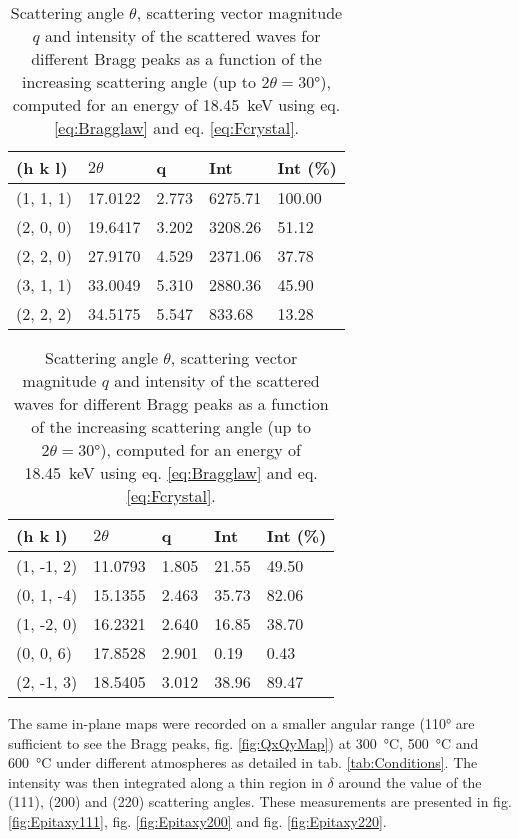 \begin{table}[htb!]
    \begin{minipage}{.45\linewidth}
        \centering
        \begin{tabular}{@{}lllll@{}}
        \toprule
        (h k l) & $2\theta$ & q & Int & Int (\%) \\
        \midrule
        (1, 1, 1) & 17.0122 & 2.773 & 6275.71 & 100.00 \\
        (2, 0, 0) & 19.6417 & 3.202 & 3208.26 & 51.12 \\
        (2, 2, 0) & 27.9170 & 4.529 & 2371.06 & 37.78 \\
        (3, 1, 1) & 33.0049 & 5.310 & 2880.36 & 45.90 \\
        (2, 2, 2) & 34.5175 & 5.547 & 833.68 & 13.28 \\
        \bottomrule
        \end{tabular}%
    \end{minipage}%
    \hfill
    \begin{minipage}{.45\linewidth}
        \centering
        \begin{tabular}{@{}lllll@{}}
        \toprule
        (h k l) & $2\theta$ & q & Int & Int (\%) \\
        \midrule
        (1, -1, 2) & 11.0793 & 1.805 & 21.55 & 49.50 \\
        (0, 1, -4) & 15.1355 & 2.463 & 35.73 & 82.06 \\
        (1, -2, 0) & 16.2321 & 2.640 & 16.85 & 38.70 \\
        (0, 0, 6)  & 17.8528 & 2.901 & 0.19  & 0.43  \\
        (2, -1, 3) & 18.5405 & 3.012 & 38.96 & 89.47 \\
        \bottomrule
        \end{tabular}%
    \end{minipage}%
    \label{tab:Reflections}
    \caption{
        Scattering angle $\theta$, scattering vector magnitude $q$ and intensity of the scattered waves for different Bragg peaks as a function of the increasing scattering angle (up to $2\theta = \ang{30}$), computed for an energy of \qty{18.45}{\keV} using eq. \ref{eq:Bragglaw} and eq. \ref{eq:Fcrystal}.
    }
\end{table}

The same in-plane maps were recorded on a smaller angular range (\ang{110} are sufficient to see the Bragg peaks, fig. \ref{fig:QxQyMap}) at \qty{300}{\degreeCelsius}, \qty{500}{\degreeCelsius} and \qty{600}{\degreeCelsius} under different atmospheres as detailed in tab. \ref{tab:Conditions}.
The intensity was then integrated along a thin region in $\delta$ around the value of the (111), (200) and (220) scattering angles.
These measurements are presented in fig. \ref{fig:Epitaxy111}, fig. \ref{fig:Epitaxy200} and fig. \ref{fig:Epitaxy220}.

